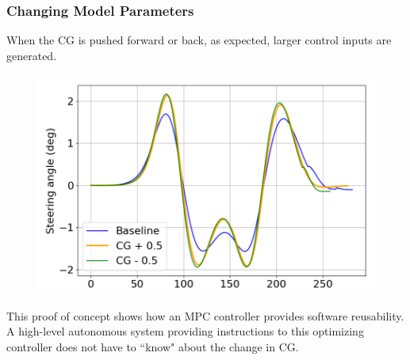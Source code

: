 \documentclass{beamer}
\begin{document}
\begin{frame}
\frametitle{Changing Model Parameters}

When the CG is pushed forward or back, as expected, larger control inputs are generated.

\vspace{-0.5em}
\begin{figure}
	\includegraphics[width=0.8\linewidth]{steering_angle_cg.png}
\end{figure}
\vspace{-0.5em}

This proof of concept shows how an MPC controller provides software reusability. A high-level autonomous system providing instructions to this optimizing controller does not have to ``know" about the change in CG.
\end{frame}
 
	









	
\end{document}
